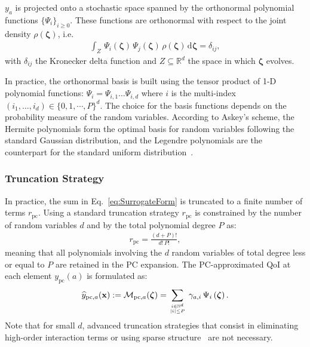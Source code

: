 $y_a$ is projected onto a stochastic space spanned by the orthonormal polynomial functions $\lbrace\Psi_{i}\rbrace_{i\geq 0}$. These functions are orthonormal with respect to the joint density $\rho(\boldsymbol{\zeta})$, i.e.
\begin{align}
\int_{Z}\,\Psi_i(\boldsymbol{\zeta})\,\Psi_j(\boldsymbol{\zeta})\,\rho(\boldsymbol{\zeta})\,\mathrm{d}\boldsymbol{\zeta} = \delta_{ij},
\label{eq:pc_innerproduct}
\end{align}
with $\delta_{ij}$ the Kronecker delta function and $Z \subseteq \mathbb{R}^d$ the space in which $\boldsymbol{\zeta}$ evolves.

In practice, the orthonormal basis is built using the tensor product of 1-D polynomial functions: $\Psi_i=\Psi_{i,1}\ldots\Psi_{i,d}$ where $i$ is the multi-index $(i_1,\ldots,i_d)\in\{0,1,\cdots,P\}^d$. The choice for the basis functions depends on the probability measure of the random variables. According to Askey's scheme, the Hermite polynomials form the optimal basis for random variables following the standard Gaussian distribution, and the Legendre polynomials are the counterpart for the standard uniform distribution~\citep{xiu2002}. 

\subsubsection{Truncation Strategy}

In practice, the sum in Eq.~\eqref{eq:SurrogateForm} is truncated to a finite number of terms $r_{\text{pc}}$. Using a standard truncation strategy $r_{\text{pc}}$ is constrained by the number of random variables $d$ and by the total polynomial degree $P$ as:
\begin{align}
r_{\text{pc}} = \frac{(d + P)!}{d!\,P!},
\label{eq:pc_order}
\end{align}
meaning that all polynomials involving the $d$ random variables of total degree less or equal to $P$ are retained in the PC expansion. The PC-approximated QoI at each element $y_{\text{pc}}(a)$ is formulated as:
\begin{align}
\widehat{y}_{\text{pc},a}(\mathbf{x}) := \mathcal{M}_{\text{pc},a}(\boldsymbol{\zeta}) = \displaystyle\sum_{i\in\mathbb{N}^d\atop|i|\leq P}\,\gamma_{a,i}\,\Psi_i\left(\boldsymbol{\zeta}\right).
\label{eq:SurrogatePC}
\end{align}
Note that for small $d$, advanced truncation strategies that consist in eliminating high-order interaction terms or using sparse structure~\citep{blatman2009phd,migliorati2013} are not necessary.

